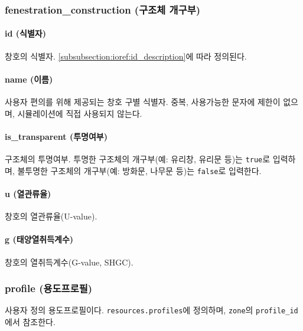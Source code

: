 \subsubsection{fenestration\_construction (구조체 개구부)} \label{subsubsection:ioref:fenestrationconstruction}


\paragraph{id (식별자)} 창호의 식별자. \ref{subsubsection:ioref:id_description}에 따라 정의된다.

\paragraph{name (이름)} 사용자 편의를 위해 제공되는 창호 구별 식별자. 중복, 사용가능한 문자에 제한이 없으며, 시뮬레이션에 직접 사용되지 않는다.

\paragraph{is\_transparent (투명여부)} 구조체의 투명여부. 투명한 구조체의 개구부(예: 유리창, 유리문 등)는 \texttt{true}로 입력하며, 불투명한 구조체의 개구부(예: 방화문, 나무문 등)는 \texttt{false}로 입력한다.

\paragraph{u (열관류율)} 창호의 열관류율(U-value).

\paragraph{g (태양열취득계수)} 창호의 열취득계수(G-value, SHGC).

\subsubsection{profile (용도프로필)} \label{subsubsection:ioref:profile}
사용자 정의 용도프로필이다. \texttt{resources.profiles}에 정의하며, \texttt{zone}의 \texttt{profile\_id}에서 참조한다.

